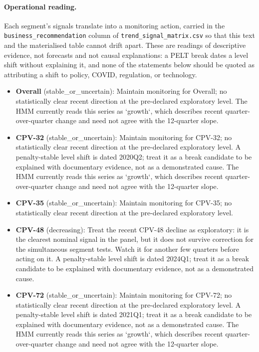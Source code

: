 \documentclass[11pt,a4paper]{article}
\newcommand{\code}[1]{\texttt{#1}}
\newcommand{\pathcode}[1]{\texttt{\small #1}}
\begin{document}
\paragraph{Operational reading.} Each segment's signals translate into a
monitoring action, carried in the \code{business\_recommendation} column of
\pathcode{trend\_signal\_matrix.csv} so that this text and the materialised
table cannot drift apart. These are readings of descriptive evidence, not
forecasts and not causal explanations: a PELT break dates a level shift without
explaining it, and none of the statements below should be quoted as attributing a
shift to policy, COVID, regulation, or technology.
\begin{itemize}
\item \textbf{Overall} (stable\_or\_uncertain): Maintain monitoring for Overall; no statistically clear recent direction at the pre-declared exploratory level. The HMM currently reads this series as `growth`, which describes recent quarter-over-quarter change and need not agree with the 12-quarter slope.
\item \textbf{CPV-32} (stable\_or\_uncertain): Maintain monitoring for CPV-32; no statistically clear recent direction at the pre-declared exploratory level. A penalty-stable level shift is dated 2020Q2; treat it as a break candidate to be explained with documentary evidence, not as a demonstrated cause. The HMM currently reads this series as `growth`, which describes recent quarter-over-quarter change and need not agree with the 12-quarter slope.
\item \textbf{CPV-35} (stable\_or\_uncertain): Maintain monitoring for CPV-35; no statistically clear recent direction at the pre-declared exploratory level.
\item \textbf{CPV-48} (decreasing): Treat the recent CPV-48 decline as exploratory: it is the clearest nominal signal in the panel, but it does not survive correction for the simultaneous segment tests. Watch it for another few quarters before acting on it. A penalty-stable level shift is dated 2024Q1; treat it as a break candidate to be explained with documentary evidence, not as a demonstrated cause.
\item \textbf{CPV-72} (stable\_or\_uncertain): Maintain monitoring for CPV-72; no statistically clear recent direction at the pre-declared exploratory level. A penalty-stable level shift is dated 2021Q1; treat it as a break candidate to be explained with documentary evidence, not as a demonstrated cause. The HMM currently reads this series as `growth`, which describes recent quarter-over-quarter change and need not agree with the 12-quarter slope.
\end{itemize}
\end{document}
